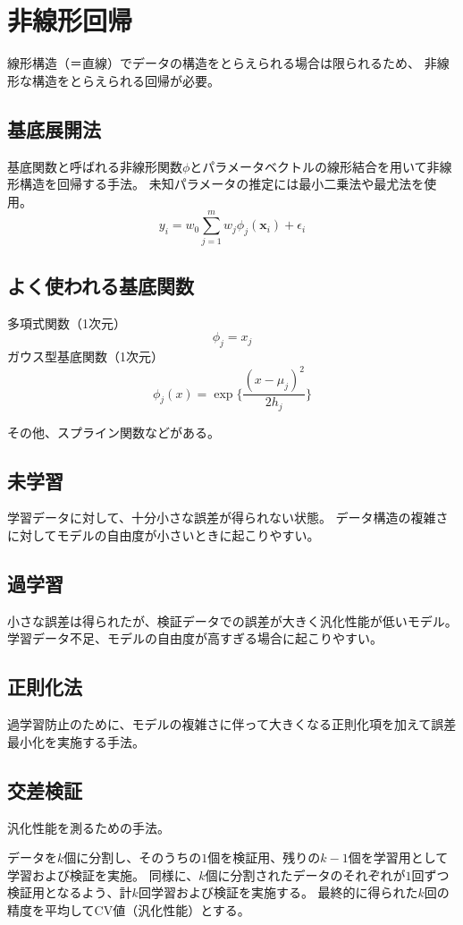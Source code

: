 \documentclass[b5paper,12pt]{jarticle}
\begin{document}
\section{非線形回帰}
線形構造（＝直線）でデータの構造をとらえられる場合は限られるため、
非線形な構造をとらえられる回帰が必要。

\subsection{基底展開法}
基底関数と呼ばれる非線形関数$\phi$とパラメータベクトルの線形結合を用いて非線形構造を回帰する手法。
未知パラメータの推定には最小二乗法や最尤法を使用。
\[
  y_i = w_0 \sum_{j=1}^{m}w_j \phi_j (\boldsymbol{x}_i)+\epsilon_i
\]

\subsection{よく使われる基底関数}

多項式関数（1次元）
\[
  \phi_j = x_j
\]
ガウス型基底関数（1次元）
\[
  \phi_j (x) = \exp \{\frac{(x-\mu_j)^2}{2h_j}\}
\]

その他、スプライン関数などがある。

\subsection{未学習}
学習データに対して、十分小さな誤差が得られない状態。
データ構造の複雑さに対してモデルの自由度が小さいときに起こりやすい。

\subsection{過学習}
小さな誤差は得られたが、検証データでの誤差が大きく汎化性能が低いモデル。
学習データ不足、モデルの自由度が高すぎる場合に起こりやすい。

\subsection{正則化法}
過学習防止のために、モデルの複雑さに伴って大きくなる正則化項を加えて誤差最小化を実施する手法。

\subsection{交差検証}
汎化性能を測るための手法。

データを$k$個に分割し、そのうちの$1$個を検証用、残りの$k-1$個を学習用として学習および検証を実施。
同様に、$k$個に分割されたデータのそれぞれが$1$回ずつ検証用となるよう、計$k$回学習および検証を実施する。
最終的に得られた$k$回の精度を平均してCV値（汎化性能）とする。
\end{document}
